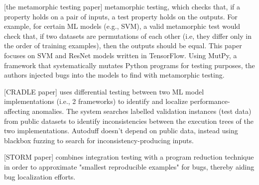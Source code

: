 [the metamorphic testing paper] metamorphic testing, which checks that, if a property holds on a pair of inputs, a test property holds on the outputs. For example, for certain ML models (e.g., SVM), a valid metamorphic test would check that, if two datasets are permutations of each other (i.e, they differ only in the order of training examples), then the outputs should be equal. This paper focuses on SVM and ResNet models written in TensorFlow. Using MutPy, a framework that systematically mutates Python programs for testing purposes, the authors injected bugs into the models to find with metamorphic testing.

[CRADLE paper] uses differential testing between two ML model implementations (i.e., 2 frameworks) to identify and localize performance-affecting anomalies. The system searches labelled validation instances (test data) from public datasets to identify inconsistencies between the execution trees of the two implementations. Autoduff doesn't depend on public data, instead using blackbox fuzzing to search for inconsistency-producing inputs.

[STORM paper] combines integration testing with a program reduction technique in order to approximate "smallest reproducible examples" for bugs, thereby aiding bug localization efforts.
